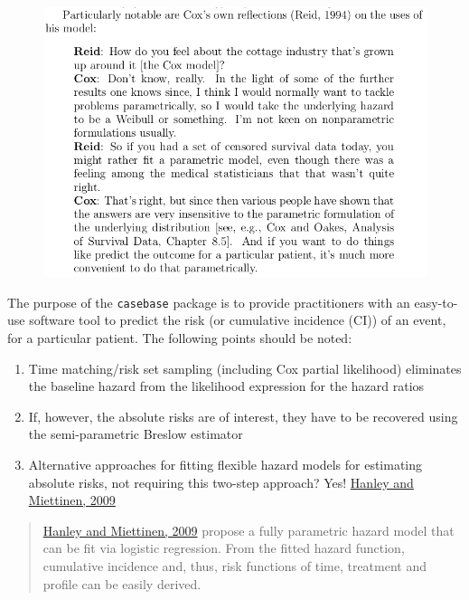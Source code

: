 \documentclass[article]{jss}
\providecommand{\tightlist}{%
  \setlength{\itemsep}{0pt}\setlength{\parskip}{0pt}}
\begin{document}
\begin{figure}[htbp]
\centering
\includegraphics{figures/reid_cox.png}
\caption{}
\end{figure}

The purpose of the \texttt{casebase} package is to provide practitioners
with an easy-to-use software tool to predict the risk (or cumulative
incidence (CI)) of an event, for a particular patient. The following
points should be noted:

\begin{enumerate}
\def\labelenumi{\arabic{enumi}.}
\tightlist
\item
  Time matching/risk set sampling (including Cox partial likelihood)
  eliminates the baseline hazard from the likelihood expression for the
  hazard ratios
\item
  If, however, the absolute risks are of interest, they have to be
  recovered using the semi-parametric Breslow estimator
\item
  Alternative approaches for fitting flexible hazard models for
  estimating absolute risks, not requiring this two-step approach? Yes!
  \href{https://github.com/sahirbhatnagar/casebase/blob/master/references/Hanley_Miettinen-2009-Inter_J_of_Biostats.pdf}{Hanley
  and Miettinen, 2009}
\end{enumerate}

\begin{quote}
\href{https://github.com/sahirbhatnagar/casebase/blob/master/references/Hanley_Miettinen-2009-Inter_J_of_Biostats.pdf}{Hanley
and Miettinen, 2009} propose a fully parametric hazard model that can be
fit via logistic regression. From the fitted hazard function, cumulative
incidence and, thus, risk functions of time, treatment and profile can
be easily derived.
\end{quote}
\end{document}
